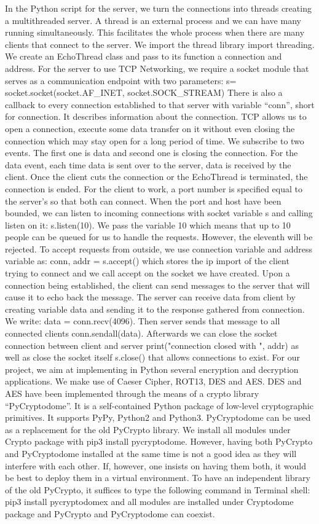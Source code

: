 In the Python script for the server, we turn the connections into threads creating a multithreaded server. A thread is an external process and we can have many running simultaneously. This facilitates the whole process when there are many clients that connect to the server. We import the thread library import threading. We create an EchoThread class and pass to its function a connection and address. For the server to use TCP Networking, we require a socket module that serves as a communication endpoint with two parameters:
s= socket.socket(socket.AF\_INET, socket.SOCK\_STREAM)
There is also a callback to every connection established to that server with variable “conn”, short for connection. It describes information about the connection. TCP allows us to open a connection, execute some data transfer on it without even closing the connection which may stay open for a long period of time. We subscribe to two events. The first one is data and second one is closing the connection. For the data event, each time data is sent over to the server, data is received by the client. Once the client cuts the connection or the EchoThread is terminated, the connection is ended.
For the client to work, a port number is specified equal to the server’s so that both can connect. When the port and host have been bounded, we can listen to incoming connections with socket variable s and calling listen on it: s.listen(10). We pass the variable 10 which means that up to 10 people can be queued for us to handle the requests. However, the eleventh will be rejected. To accept requests from outside, we use connection variable and address variable as: conn, addr = s.accept() which stores the ip import of the client trying to connect and we call accept on the socket we have created. Upon a connection being established, the client can send messages to the server that will cause it to echo back the message. The server can receive data from client by creating variable data and sending it to the response gathered from connection. We write: data = conn.recv(4096). Then server sends that message to all connected clients conn.sendall(data). Afterwards we can close the socket connection between client and server print("connection closed with ", addr) as well as close the socket itself s.close() that allows connections to exist.
For our project, we aim at implementing in Python several encryption and decryption applications. We make use of Caeser Cipher, ROT13, DES and AES.
DES and AES have been implemented through the means of a crypto library “PyCryptodome”. It is a self-contained Python package of low-level cryptographic primitives. It supports PyPy, Python2 and Python3. PyCryptodome can be used as a replacement for the old PyCrypto library. We install all modules under Crypto package with pip3 install pycryptodome.  However, having both PyCrypto and PyCryptodome installed at the same time is not a good idea as they will interfere with each other. If, however, one insists on having them both, it would be best to deploy them in a virtual environment. To have an independent library of the old PyCrypto, it suffices to type the following command in Terminal shell: pip3 install pycryptodomex and all modules are installed under Cryptodome package and PyCrypto and PyCryptodome can coexist. 


